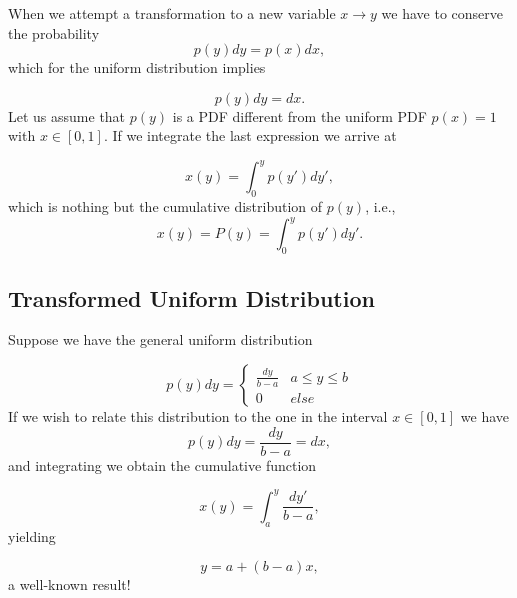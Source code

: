 \documentclass[%
oneside,                 %
final,                   %
10pt]{article}
\newenvironment{block_mdfboxadmon}[1][]{
\begin{block_mdfboxmdframed}[frametitle=#1]
}
{
\end{block_mdfboxmdframed}
}
\begin{document}
\begin{block_mdfboxadmon}[]
When we attempt a 
transformation to a new variable 
$x\rightarrow y$ 
we have to conserve the probability
\begin{equation*}
   p(y)dy=p(x)dx,
\end{equation*}
which for the uniform distribution implies

\begin{equation*}
   p(y)dy=dx.  
\end{equation*}
Let us assume that $p(y)$ is a  PDF different from the uniform
PDF $p(x)=1$ with $x \in [0,1]$.
If we integrate the last expression we arrive at

\begin{equation*}
   x(y)=\int_0^y p(y')dy',
\end{equation*}
which is nothing but the cumulative distribution of $p(y)$, i.e.,
\begin{equation*}
   x(y)=P(y)=\int_0^y p(y')dy'.
\end{equation*}
\end{block_mdfboxadmon} %




\subsection{Transformed Uniform Distribution}

\begin{block_mdfboxadmon}[]
Suppose we have the general uniform distribution

\begin{equation*}
p(y)dy=\left\{\begin{array}{cc} \frac{dy}{b-a} & a \le y \le b\\
                                0  & else\end{array}\right.
\end{equation*}
If we wish to relate this distribution to the one in the interval
$x \in [0,1]$
we have
\begin{equation*}
   p(y)dy=\frac{dy}{b-a}=dx,  
\end{equation*}
and integrating we obtain the cumulative function

\begin{equation*}
   x(y)=\int_a^y \frac{dy'}{b-a}, 
\end{equation*}
yielding

\begin{equation*}
    y=a+(b-a)x,
\end{equation*}
a well-known result!
\end{block_mdfboxadmon} %
\end{document}
